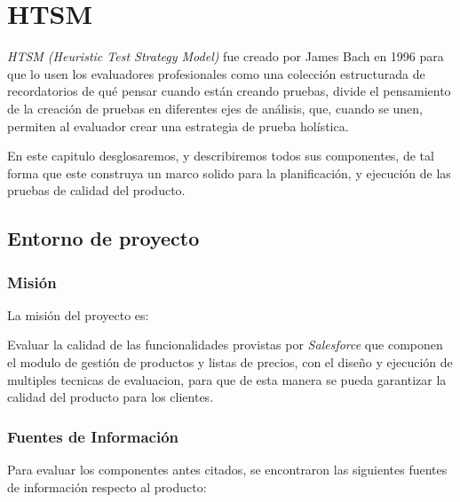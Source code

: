 \chapter{HTSM}

\emph{HTSM (Heuristic Test Strategy Model)} fue creado por James Bach en 1996
para que lo usen los evaluadores profesionales como una colección estructurada
de recordatorios de qué pensar cuando están creando pruebas, divide el
pensamiento de la creación de pruebas en diferentes ejes de análisis, que,
cuando se unen, permiten al evaluador crear una estrategia de prueba
holística\cite{Bach}.

En este capitulo desglosaremos, y describiremos todos sus componentes, de tal
forma que este construya un marco solido para la planificación, y ejecución de
las pruebas de calidad del producto.

\section{Entorno de proyecto}

\subsection{Misión}
La misión del proyecto es:

Evaluar la calidad de las funcionalidades provistas por \emph{Salesforce} que
componen el modulo de gestión de productos y listas de precios, con el diseño y
ejecución de multiples tecnicas de evaluacion, para que de esta manera se pueda
garantizar la calidad del producto para los clientes.

\subsection{Fuentes de Información}
Para evaluar los componentes antes citados, se encontraron las siguientes
fuentes de información respecto al producto:

